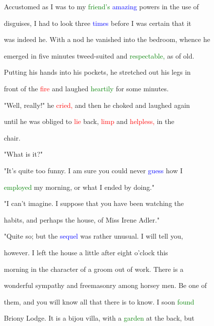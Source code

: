  Accustomed as I was to my \textcolor{green}{friend's} \textcolor{blue}{amazing} powers in the use of

 disguises, I had to look three \textcolor{blue}{times} before I was certain that it

 was indeed he. With a nod he \textcolor{BurntOrange}{vanished} into the bedroom, whence he

 emerged in five minutes tweed-suited and \textcolor{green}{respectable,} as of old.

 Putting his hands into his pockets, he stretched out his legs in

 front of the \textcolor{red}{fire} and \textcolor{BurntOrange}{laughed} \textcolor{green}{heartily} for some minutes.



 "Well, really!" he \textcolor{red}{cried,} and then he choked and \textcolor{BurntOrange}{laughed} again

 until he was \textcolor{BurntOrange}{obliged} to \textcolor{red}{lie} back, \textcolor{red}{limp} and \textcolor{red}{helpless,} in the

 chair.



 "What is it?"



 "It's quite too funny. I am sure you could never \textcolor{blue}{guess} how I

 \textcolor{green}{employed} my morning, or what I ended by doing."



 "I can't imagine. I suppose that you have been \textcolor{BurntOrange}{watching} the

 habits, and perhaps the house, of Miss Irene Adler."



 "Quite so; but the \textcolor{blue}{sequel} was rather unusual. I will tell you,

 however. I left the house a little after eight o'clock this

 morning in the character of a groom out of work. There is a

 \textcolor{BurntOrange}{wonderful} \textcolor{BurntOrange}{sympathy} and freemasonry among horsey men. Be one of

 them, and you will know all that there is to know. I soon \textcolor{green}{found}

 Briony Lodge. It is a bijou villa, with a \textcolor{green}{garden} at the back, but

